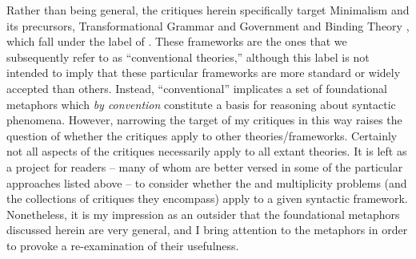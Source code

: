 Rather than being general, the critiques herein specifically target Minimalism and its precursors, Transformational Grammar \citep{Chomsky1965} and Government and Binding Theory \citep{Chomsky1982}, which fall under the label of . These frameworks are the ones that we subsequently refer to as “conventional theories,” although this label is not intended to imply that these particular frameworks are more standard or widely accepted than others. Instead, “conventional” implicates a set of foundational metaphors which \textit{by convention} constitute a basis for reasoning about syntactic phenomena. However, narrowing the target of my critiques in this way raises the question of whether the critiques apply to other theories/frameworks. Certainly not all aspects of the critiques necessarily apply to all extant theories. It is left as a project for readers -- many of whom are better versed in some of the particular approaches listed above -- to consider whether the  and multiplicity problems (and the collections of critiques they encompass) apply to a given syntactic framework. Nonetheless, it is my impression as an outsider that the foundational metaphors discussed herein are very general, and I bring attention to the metaphors in order to provoke a re-examination of their usefulness.

